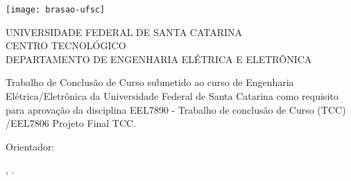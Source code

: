 \begin{titlepage}
  \begin{center}
    \texttt{[image: brasao-ufsc]}
  \end{center}

  \begin{center}
    {\small UNIVERSIDADE FEDERAL DE SANTA CATARINA}\\
    {\small CENTRO TECNOLÓGICO}\\
    {\small DEPARTAMENTO DE ENGENHARIA ELÉTRICA E ELETRÔNICA}
  \end{center}

  \vfill

  \begin{center}
    {\LARGE \thetitle}
  \end{center}

  \vfill

  \begin{center}
    Trabalho de Conclusão de Curso submetido ao curso de Engenharia Elétrica/Eletrônica da Universidade Federal de Santa Catarina como requisito para aprovação da disciplina EEL7890 - Trabalho de conclusão de Curso (TCC) /EEL7806 Projeto Final TCC.
  \end{center}

  \vfill

  \begin{center}
    {\large \theauthor}

    \medskip
    Orientador: \theadvisor\\
  \end{center}

  \vfill

  \begin{center}
    \theplace, \thedate.
  \end{center}
\end{titlepage}

\cleardoublepageempty
